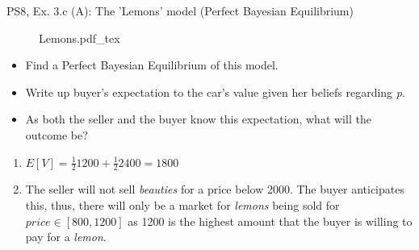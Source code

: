 \begin{frame}{PS8, Ex. 3.c (A): The 'Lemons' model (Perfect Bayesian Equilibrium)}
    \begin{figure}[!h]
      \center {}
      {Lemons.pdf_tex}
    \end{figure}
    \vspace{-8pt}
    \begin{itemize}
      \item[(c)] Find a Perfect Bayesian Equilibrium of this model.
    \end{itemize}
    \vspace{-8pt}
    \begin{multicols}{2}
      \begin{itemize}
        \item[Step 1:] Write up buyer's expectation to the car's value given her beliefs regarding \textit{p}.
        \item[Step 2:] As both the seller and the buyer know this expectation, what will the outcome be?
      \end{itemize}
      \vfill\null\columnbreak
      \begin{enumerate}
        \item $E[V]=\frac{1}{2}1200+\frac{1}{2}2400=1800$
        \item The seller will not sell \textit{beauties} for a price below 2000. The buyer anticipates this, thus, there will only be a market for \textit{lemons} being sold for $price\in[800,1200]$ as 1200 is the highest amount that the buyer is willing to pay for a \textit{lemon}.
      \end{enumerate}
      \vfill\null
    \end{multicols}
\end{frame}
